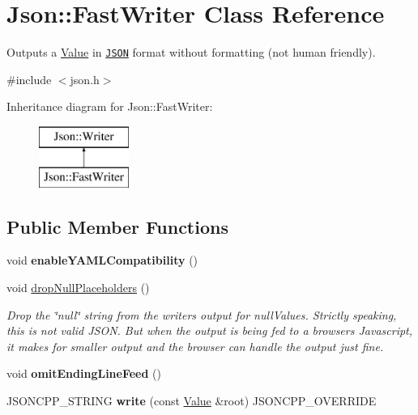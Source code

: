 \hypertarget{classJson_1_1FastWriter}{}\section{Json\+:\+:Fast\+Writer Class Reference}
\label{classJson_1_1FastWriter}


Outputs a \hyperlink{classJson_1_1Value}{Value} in \href{http://www.json.org}{\tt J\+S\+ON} format without formatting (not human friendly).  




{\ttfamily \#include $<$json.\+h$>$}

Inheritance diagram for Json\+:\+:Fast\+Writer\+:\begin{figure}[H]
\begin{center}
\leavevmode
\includegraphics[height=2.000000cm]{classJson_1_1FastWriter}
\end{center}
\end{figure}
\subsection*{Public Member Functions}
\begin{DoxyCompactItemize}
\item 
void {\bfseries enable\+Y\+A\+M\+L\+Compatibility} ()\hypertarget{classJson_1_1FastWriter_a78d98e9f76d33660ad6e6a1abe287d45}{}\label{classJson_1_1FastWriter_a78d98e9f76d33660ad6e6a1abe287d45}

\item 
void \hyperlink{classJson_1_1FastWriter_a6e93d8dce951e408517311026a065b40}{drop\+Null\+Placeholders} ()\hypertarget{classJson_1_1FastWriter_a6e93d8dce951e408517311026a065b40}{}\label{classJson_1_1FastWriter_a6e93d8dce951e408517311026a065b40}

\begin{DoxyCompactList}\small\item\em Drop the \char`\"{}null\char`\"{} string from the writer\textquotesingle{}s output for null\+Values. Strictly speaking, this is not valid J\+S\+ON. But when the output is being fed to a browser\textquotesingle{}s Javascript, it makes for smaller output and the browser can handle the output just fine. \end{DoxyCompactList}\item 
void {\bfseries omit\+Ending\+Line\+Feed} ()\hypertarget{classJson_1_1FastWriter_af4ee077d365d75941fb2688d97207a55}{}\label{classJson_1_1FastWriter_af4ee077d365d75941fb2688d97207a55}

\item 
J\+S\+O\+N\+C\+P\+P\+\_\+\+S\+T\+R\+I\+NG {\bfseries write} (const \hyperlink{classJson_1_1Value}{Value} \&root) J\+S\+O\+N\+C\+P\+P\+\_\+\+O\+V\+E\+R\+R\+I\+DE\hypertarget{classJson_1_1FastWriter_a93d45ba4bc312371d08beb3e3dfbe654}{}\label{classJson_1_1FastWriter_a93d45ba4bc312371d08beb3e3dfbe654}

\end{DoxyCompactItemize}


